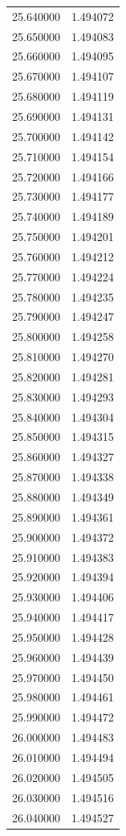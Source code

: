 \begin{tabular}{rr}
25.640000 & 1.494072 \\
25.650000 & 1.494083 \\
25.660000 & 1.494095 \\
25.670000 & 1.494107 \\
25.680000 & 1.494119 \\
25.690000 & 1.494131 \\
25.700000 & 1.494142 \\
25.710000 & 1.494154 \\
25.720000 & 1.494166 \\
25.730000 & 1.494177 \\
25.740000 & 1.494189 \\
25.750000 & 1.494201 \\
25.760000 & 1.494212 \\
25.770000 & 1.494224 \\
25.780000 & 1.494235 \\
25.790000 & 1.494247 \\
25.800000 & 1.494258 \\
25.810000 & 1.494270 \\
25.820000 & 1.494281 \\
25.830000 & 1.494293 \\
25.840000 & 1.494304 \\
25.850000 & 1.494315 \\
25.860000 & 1.494327 \\
25.870000 & 1.494338 \\
25.880000 & 1.494349 \\
25.890000 & 1.494361 \\
25.900000 & 1.494372 \\
25.910000 & 1.494383 \\
25.920000 & 1.494394 \\
25.930000 & 1.494406 \\
25.940000 & 1.494417 \\
25.950000 & 1.494428 \\
25.960000 & 1.494439 \\
25.970000 & 1.494450 \\
25.980000 & 1.494461 \\
25.990000 & 1.494472 \\
26.000000 & 1.494483 \\
26.010000 & 1.494494 \\
26.020000 & 1.494505 \\
26.030000 & 1.494516 \\
26.040000 & 1.494527 \\

\end{tabular}
